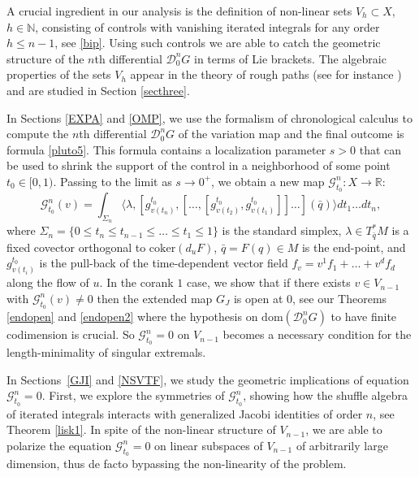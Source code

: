 \documentclass[12pt, reqno]{amsart}
\theoremstyle{plain}
\theoremstyle{definition}
\theoremstyle{remark}
\numberwithin{equation}{section}
\newcommand{\R}{\mathbb{R}}
\newcommand{\N}{\mathbb{N}}
\newcommand{\0}{\theta}
\newcommand{\la}{\lambda}
\newcommand{\1}{{-1}}
\newcommand{\q}{\bar q}
\renewcommand{\=}{\coloneqq}
\renewcommand{\.}{\dots}
\newcommand{\mc}{\mathcal}
\newcommand{\coker}{\mathrm{coker}}
\newcommand{\dom}{\mathrm{dom}}
\begin{document}
A crucial ingredient in our analysis is the definition of non-linear  sets $V_{h}\subset X$, $h\in \N$,
consisting of   controls with vanishing  iterated integrals for any order $h\leq n-1$,  see \eqref{bip}. Using such controls we are able to catch the geometric structure of the $n$th differential $\mc D_0^nG$ in terms of Lie brackets. {\color{black} 
The algebraic properties of the sets $V_h$ appear in  the theory of rough paths (see for instance \cite{Lyo}) and
are studied in 
Section \ref{secthree}}.






In {\color{black}Sections \ref{EXPA} and \ref{OMP},}  we use the formalism of chronological calculus \cite[Chapter 2]{AgrSac} to compute the $n$th   differential $\mc{D}_0^n G$ of the variation map
and the final outcome is formula \eqref{pluto5}. This formula contains a localization parameter $s>0$ that can be used to shrink the support of the control in a neighborhood of some point $t_0\in [0,1)$. Passing to the limit as $s\to0^+$, we obtain  a new map 
 $\mc G^n _{t_0}: X\to \R$:
\[
	\mc G^n _{t_0}(v) = \int_{\Sigma_n } \langle \la,[ g_{v(t_n)}^{t_0} , [ \.,[g_{v(t_2)}^{t_0},  g_{v(t_1)}^{t_0}]]\ldots] (\q ) \rangle dt_1\dots dt_n,
\]
where $\Sigma_n =\{ 0\leq  t_n\le t_{n-1}\leq\ldots\leq t_1 \le 1\}$ is the standard simplex, 
$\lambda \in T^*_{\q }M$ is a fixed covector orthogonal to $\coker(d_u F)$, 
$\q  = F(q)\in M $ is the end-point,
and 
$
g_{v(t_i)}^{t_0} $ is the pull-back of the time-dependent vector field $f_v= v^1 f_1 +\ldots + v^d f_d$ along the flow of $u$. 
In the corank $1$ case, we show that  if there exists $v\in V_{n-1}$ with 
	$\mc G^n _{t_0}(v) \neq0$
then the extended map $G_J$ is open at $0$, see  our  Theorems \ref{endopen} and 
\ref{endopen2} where the hypothesis on $\dom(\mc D _0^nG)$ to have finite codimension is crucial. So $\mc G^n _{t_0}=0 $ on $V_{n-1}$ becomes a necessary condition for the length-minimality of singular extremals.


 

In Sections~\ref{GJI} and \ref{NSVTF}, we study the geometric implications of   equation $\mc G^n _{t_0}=0$. 
First, we explore the symmetries of  $\mc G^n _{t_0}$, showing how the shuffle algebra of   iterated integrals  interacts with  generalized Jacobi identities of order $n$, see Theorem \ref{lisk1}. In spite of the non-linear structure of $V_{n-1}$, we are able to polarize the equation $\mc G^n _{t_0}=0$ on linear subspaces of $V_{n-1}$ 
of arbitrarily large dimension, thus  de facto bypassing the non-linearity of the problem. 
\end{document}

